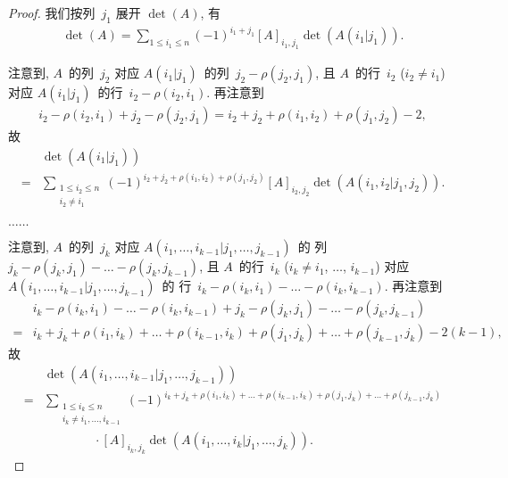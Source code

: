 \begin{proof}
    我们按列~\(j_1\) 展开 \(\det {(A)}\),
    有
    \begin{align*}
        \det {(A)}
        = \sum_{1 \leq i_1 \leq n}
        {(-1)^{i_1 + j_1} [A]_{i_1,j_1} \det {(A(i_1|j_1))}}.
    \end{align*}

    注意到, \(A\)~的列~\(j_2\) 对应
    \(A(i_1|j_1)\)~的列~\(j_2 - \rho(j_2, j_1)\),
    且 \(A\)~的行~\(i_2\) (\(i_2 \neq i_1\)) 对应
    \(A(i_1|j_1)\)~的行~\(i_2 - \rho(i_2, i_1)\).
    再注意到
    \begin{align*}
        i_2 - \rho(i_2, i_1) + j_2 - \rho(j_2, j_1)
        = i_2 + j_2 + \rho(i_1, i_2) + \rho(j_1, j_2) - 2,
    \end{align*}
    故
    \begin{align*}
             &
        \det {(A(i_1|j_1))}
        \\
        = {} &
        \sum_{\substack{
        1 \leq i_2 \leq n \\
            i_2 \neq i_1
        }}
        {(-1)^{i_2 + j_2 + \rho(i_1, i_2) + \rho(j_1, j_2)}
            [A]_{i_2,j_2} \det {(A({i_1,i_2}|{j_1,j_2}))}}.
    \end{align*}

    \(\dots \dots\)

    注意到, \(A\)~的列~\(j_k\) 对应
    \(A({i_1,\dots,i_{k-1}}|{j_1,\dots,j_{k-1}})\)~的%
    列~\(j_k - \rho(j_k, j_1) - \dots - \rho(j_k, j_{k-1})\),
    且 \(A\)~的行~\(i_k\)
    (\(i_k \neq i_1\), \(\dots\), \(i_{k-1}\)) 对应
    \(A({i_1,\dots,i_{k-1}}|{j_1,\dots,j_{k-1}})\)~的%
    行~\(i_k - \rho(i_k, i_1) - \dots - \rho(i_k, i_{k-1})\).
    再注意到
    \begin{align*}
             &
        i_k - \rho(i_k, i_1) - \dots - \rho(i_k, i_{k-1})
        + j_k - \rho(j_k, j_1) - \dots - \rho(j_k, j_{k-1})
        \\
        = {} &
        i_k + j_k
        + \rho(i_1, i_k) + \dots + \rho(i_{k-1}, i_k)
        + \rho(j_1, j_k) + \dots + \rho(j_{k-1}, j_k)
        - 2(k-1),
    \end{align*}
    故
    \begin{align*}
             &
        \det {(A({i_1,\dots,i_{k-1}}|{j_1,\dots,j_{k-1}}))}
        \\
        = {} &
        \sum_{\substack{
        1 \leq i_k \leq n \\
                i_k \neq i_1, \dots, i_{k-1}
            }}
        {(-1)^{i_k + j_k
                    + \rho(i_1, i_k) + \dots + \rho(i_{k-1}, i_k)
                    + \rho(j_1, j_k) + \dots
                    + \rho(j_{k-1}, j_k)}}
        \\
             &
        \qquad \qquad
        \cdot
        [A]_{i_k,j_k}
        \det {(A({i_1,\dots,i_{k}}|{j_1,\dots,j_{k}}))}.
    \end{align*}


\end{proof}
